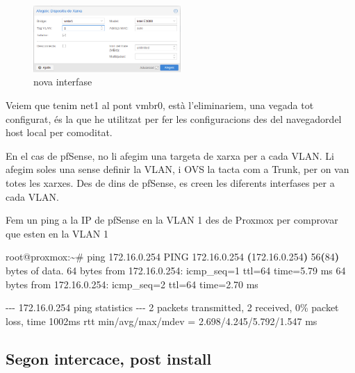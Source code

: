 \documentclass[
  10pt,
]{krantz}
\newenvironment{Shaded}{\begin{snugshade}}{\end{snugshade}}
\newcommand{\AttributeTok}[1]{\textcolor[rgb]{0.77,0.63,0.00}{#1}}
\newcommand{\ErrorTok}[1]{\textcolor[rgb]{0.64,0.00,0.00}{\textbf{#1}}}
\newcommand{\ExtensionTok}[1]{#1}
\newcommand{\KeywordTok}[1]{\textcolor[rgb]{0.13,0.29,0.53}{\textbf{#1}}}
\newcommand{\NormalTok}[1]{#1}
\begin{document}
\begin{figure}
\centering
\includegraphics[width=0.5\textwidth,height=\textheight]{imatges/proxmox/interface_vlan.png}
\caption{nova interfase}
\end{figure}

Veiem que tenim net1 al pont vmbr0, està l'eliminariem, una vegada tot configurat, és la que he utilitzat per fer les configuracions des del navegadordel host local per comoditat.

En el cas de pfSense, no li afegim una targeta de xarxa per a cada VLAN. Li afegim soles una sense definir la VLAN, i OVS la tacta com a Trunk, per on van totes les xarxes. Des de dins de pfSense, es creen les diferents interfases per a cada VLAN.

Fem un ping a la IP de pfSense en la VLAN 1 des de Proxmox per comprovar que esten en la VLAN 1

\begin{Shaded}
\begin{Highlighting}[]
\ExtensionTok{root@proxmox:\textasciitilde{}\#}\NormalTok{ ping 172.16.0.254}
\ExtensionTok{PING}\NormalTok{ 172.16.0.254 }\ErrorTok{(}\ExtensionTok{172.16.0.254}\KeywordTok{)} \ExtensionTok{56}\ErrorTok{(}\ExtensionTok{84}\KeywordTok{)} \ExtensionTok{bytes}\NormalTok{ of data.}
\ExtensionTok{64}\NormalTok{ bytes from 172.16.0.254: icmp\_seq=1 ttl=64 time=5.79 ms}
\ExtensionTok{64}\NormalTok{ bytes from 172.16.0.254: icmp\_seq=2 ttl=64 time=2.70 ms}

\ExtensionTok{{-}{-}{-}}\NormalTok{ 172.16.0.254 ping statistics }\AttributeTok{{-}{-}{-}}
\ExtensionTok{2}\NormalTok{ packets transmitted, 2 received, 0\% packet loss, time 1002ms}
\ExtensionTok{rtt}\NormalTok{ min/avg/max/mdev = 2.698/4.245/5.792/1.547 ms}
\end{Highlighting}
\end{Shaded}

\hypertarget{segon-intercace-post-install}{%
\subsection{Segon intercace, post install}\label{segon-intercace-post-install}}
\end{document}
